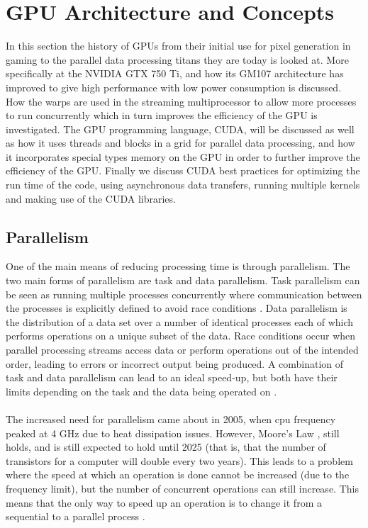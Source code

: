 \section{GPU Architecture and Concepts}\label{gpu}
In this section the history of GPUs from their initial use for pixel generation in gaming to the parallel data processing titans they are today is looked at. More specifically at the NVIDIA GTX 750 Ti, and how its GM107 architecture has improved to give high performance with low power consumption is discussed. How the warps are used in the streaming multiprocessor to allow more processes to run concurrently which in turn improves the efficiency of the GPU is investigated. The GPU programming language, CUDA, will be discussed as well as how it uses threads and blocks in a grid for parallel data processing, and how it incorporates special types memory on the GPU in order to further improve the efficiency of the GPU. Finally we discuss CUDA best practices for optimizing the run time of the code, using asynchronous data transfers, running multiple kernels and making use of the CUDA libraries.
\subsection{Parallelism}\label{gpu:sec:par}
One of the main means of reducing processing time is through parallelism. The two main forms of parallelism are task and data parallelism. Task parallelism can be seen as running multiple processes concurrently where communication between the processes is explicitly defined to avoid race conditions \citep{subhlok1993exploiting}. Data parallelism is the distribution of a data set over a number of identical processes each of which performs operations on a unique subset of the data. Race conditions occur when parallel processing streams access data or perform operations out of the intended order, leading to errors or incorrect output being produced. A combination of task and data parallelism can lead to an ideal speed-up, but both have their limits depending on the task and the data being operated on \citep{subhlok1993exploiting}.
\\
\\
The increased need for parallelism came about in 2005, when \gls{cpu} frequency peaked at 4 GHz due to heat dissipation issues. However, Moore's Law \citep{moore2006cramming}, still holds, and is still expected to hold until 2025 (that is, that the number of transistors for a computer will double every two years). This leads to a problem where the speed at which an operation is done cannot be increased (due to the frequency limit), but the number of concurrent operations can still increase. This means that the only way to speed up an operation is to change it from a sequential to a parallel process \citep{rajan2013informatics}.
